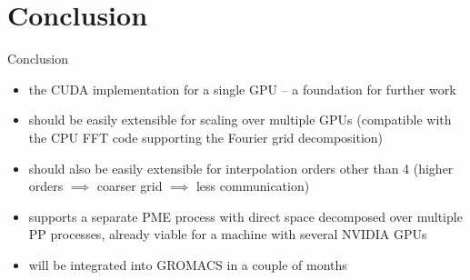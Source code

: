 \documentclass[11pt]{beamer}
\begin{document}
\section{Conclusion}

\begin{frame}{Conclusion}
\begin{itemize}
\item the CUDA implementation for a single GPU -- a foundation for further work
\item should be easily extensible for scaling over multiple GPUs
(compatible with the CPU FFT code supporting the Fourier grid decomposition)
\item should also be easily extensible for interpolation orders other than 4
(higher orders $\implies$ coarser grid $\implies$ less communication)
\item supports a separate PME process with direct space decomposed over multiple PP processes, already viable for a machine with several NVIDIA GPUs 
\item will be integrated into GROMACS in a couple of months
\end{itemize}
\end{frame}




\end{document}
